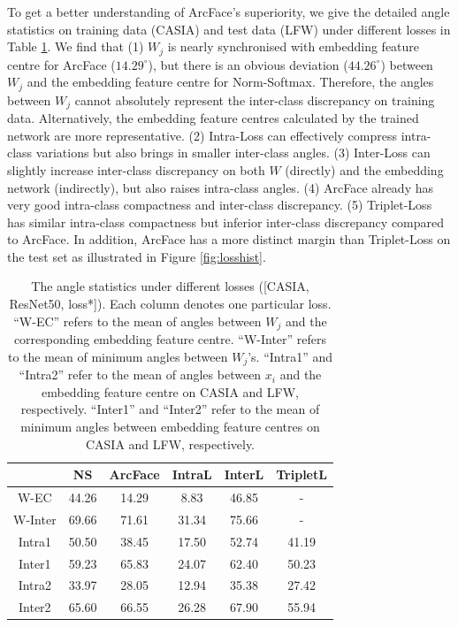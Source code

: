 \documentclass[10pt,twocolumn,letterpaper]{article}
\begin{document}
To get a better understanding of ArcFace's superiority, we give the detailed angle statistics on training data (CASIA) and test data (LFW) under different losses in Table \ref{table:angledistributionchanges2}. We find that (1) $W_j$ is nearly synchronised with embedding feature centre for ArcFace ($14.29^{\circ}$), but there is an obvious deviation ($44.26^{\circ}$) between $W_j$ and the embedding feature centre for Norm-Softmax. Therefore, the angles between $W_j$ cannot absolutely represent the inter-class discrepancy on training data. Alternatively, the embedding feature centres calculated by the trained network are more representative. (2) Intra-Loss can effectively compress intra-class variations but also brings in smaller inter-class angles. (3) Inter-Loss can slightly increase inter-class discrepancy on both $W$ (directly) and the embedding network (indirectly), but also raises intra-class angles. (4) ArcFace already has very good intra-class compactness and inter-class discrepancy. (5) Triplet-Loss has similar intra-class compactness but inferior inter-class discrepancy compared to ArcFace. In addition, ArcFace has a more distinct margin than Triplet-Loss on the test set as illustrated in Figure \ref{fig:losshist}.

\begin{table}[t!]
\begin{center}
\begin{tabular}{c|c|c|c|c|c}
\hline
       & NS  & ArcFace & IntraL & InterL & TripletL\\
\hline
W-EC   &44.26&14.29& 8.83& 46.85 & - \\
W-Inter&69.66&71.61&31.34& 75.66 & - \\
Intra1 &50.50&38.45&17.50& 52.74 & 41.19 \\
Inter1 &59.23&65.83&24.07& 62.40 & 50.23 \\
\hline
Intra2 &33.97&28.05&12.94& 35.38 & 27.42 \\
Inter2 &65.60&66.55&26.28& 67.90 & 55.94\\
\hline
\end{tabular}
\end{center}
\caption{The angle statistics under different losses ([CASIA, ResNet50, loss*]). Each column denotes one particular loss. ``W-EC'' refers to the mean of angles between $W_j$ and the corresponding embedding feature centre. ``W-Inter'' refers to the mean of minimum angles between $W_j$'s. ``Intra1'' and ``Intra2'' refer to the mean of angles between $x_i$ and the embedding feature centre on CASIA and LFW, respectively. ``Inter1'' and ``Inter2'' refer to the mean of minimum angles between embedding feature centres on CASIA and LFW, respectively.}
\label{table:angledistributionchanges2}
\vspace{-4mm}
\end{table}
\end{document}
